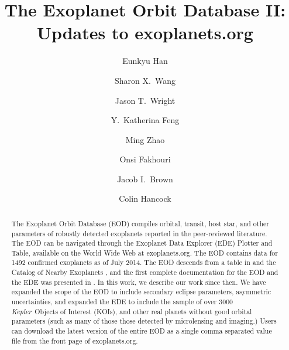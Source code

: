 \documentclass[11pt,preprint]{aastex}
\def\kepler{\textit{Kepler}}
\begin{document}
\begin{CJK*}{UTF8}{gbsn}

\title{The Exoplanet Orbit Database \textsc{II}: Updates to
  exoplanets.org}

\author{Eunkyu Han}
\author{Sharon X.\ Wang}
\author{Jason T.\ Wright}
\author{Y.\ Katherina Feng}
\author{Ming Zhao}
\author{Onsi Fakhouri}
\author{Jacob I.\ Brown}
\author{Colin Hancock}


\begin{abstract}

The Exoplanet Orbit Database (EOD) compiles orbital, transit, host
star, and other parameters of robustly detected exoplanets reported in
the peer-reviewed literature. The EOD can be navigated through the
Exoplanet Data Explorer (EDE) Plotter and Table, available on the
World Wide Web at exoplanets.org. The EOD contains data for 1492
confirmed exoplanets as of July 2014.  The EOD descends from a table
in \citet{Butler2002} and the Catalog of Nearby Exoplanets
\citep{Butler2006}, and the first complete documentation for the EOD
and the EDE was presented in \cite{Wright2011}. In this work, we
describe our work since then.  We have expanded the scope of the EOD
to include secondary eclipse parameters, asymmetric uncertainties, and
expanded the EDE to include the sample of over 3000 \kepler\ Objects
of Interest (KOIs), and other real planets without good orbital
parameters (such as many of those those detected by microlensing and
imaging.) Users can download the latest version of the entire EOD as a
single comma separated value file from the front page of
exoplanets.org.

\end{abstract}  


\end{CJK*}
\end{document}
